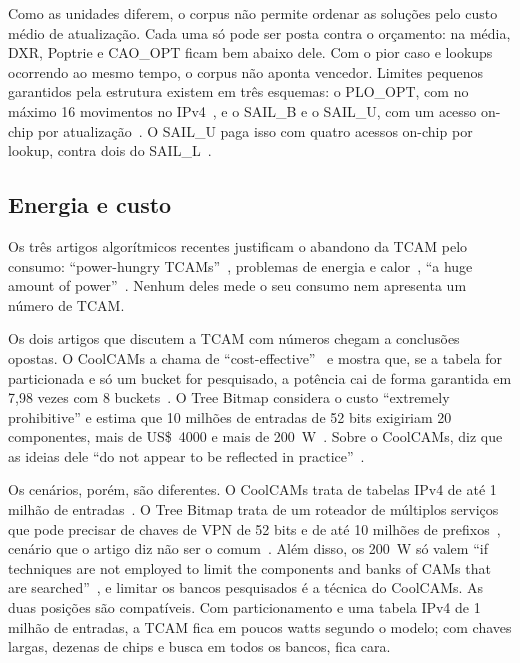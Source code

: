 \documentclass[conference,a4paper]{IEEEtran}
\begin{document}
Como as unidades diferem, o corpus não permite ordenar as soluções pelo custo médio de atualização. Cada uma só pode ser
posta contra o orçamento: na média, DXR, Poptrie e CAO\_OPT ficam bem abaixo dele. Com o pior caso e lookups ocorrendo ao
mesmo tempo, o corpus não aponta vencedor. Limites pequenos garantidos pela estrutura existem em três esquemas: o PLO\_OPT,
com no máximo 16 movimentos no IPv4~\cite[p.~40]{shah01}, e o SAIL\_B e o SAIL\_U, com um acesso on-chip por
atualização~\cite[Tab.~II]{yang18}. O SAIL\_U paga isso com quatro acessos on-chip por lookup, contra dois do
SAIL\_L~\cite[Tab.~II]{yang18}.

\subsection{Energia e custo}
Os três artigos algorítmicos recentes justificam o abandono da TCAM pelo consumo: ``power-hungry
TCAMs''~\cite[\S1]{zec12}, problemas de energia e calor~\cite[\S1]{asai15}, ``a huge amount of power''~\cite[\S II]{yang18}.
Nenhum deles mede o seu consumo nem apresenta um número de TCAM.

Os dois artigos que discutem a TCAM com números chegam a conclusões opostas. O CoolCAMs a chama de
``cost-effective''~\cite[Resumo]{zane03} e mostra que, se a tabela for particionada e só um bucket for pesquisado, a potência
cai de forma garantida em 7,98 vezes com 8 buckets~\cite[\S IV-D]{zane03}. O Tree Bitmap considera o custo
``extremely prohibitive'' e estima que 10 milhões de entradas de 52 bits exigiriam 20 componentes, mais de US\$~4000 e
mais de 200~W~\cite[\S2.3.3]{eath04}. Sobre o CoolCAMs, diz que as ideias dele ``do not appear to be reflected in
practice''~\cite[\S3]{eath04}.

Os cenários, porém, são diferentes. O CoolCAMs trata de tabelas IPv4 de até 1 milhão de entradas~\cite[\S II]{zane03}. O
Tree Bitmap trata de um roteador de múltiplos serviços que pode precisar de chaves de VPN de 52 bits e de até 10 milhões de
prefixos~\cite[\S2.1, Tab.~3]{eath04}, cenário que o artigo diz não ser o comum~\cite[\S7.2]{eath04}. Além disso, os
200~W só valem ``if techniques are not employed to limit the components and banks of CAMs that are
searched''~\cite[\S2.3.3]{eath04}, e limitar os bancos pesquisados é a técnica do CoolCAMs. As duas posições são
compatíveis. Com particionamento e uma tabela IPv4 de 1 milhão de entradas, a TCAM fica em poucos watts segundo o modelo; com
chaves largas, dezenas de chips e busca em todos os bancos, fica cara.
\end{document}
